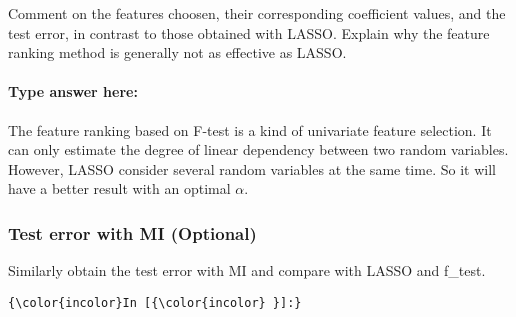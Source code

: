 \documentclass[11pt]{article}
\begin{document}
Comment on the features choosen, their corresponding coefficient values,
and the test error, in contrast to those obtained with LASSO. Explain
why the feature ranking method is generally not as effective as LASSO.

    \hypertarget{type-answer-here}{%
\paragraph{Type answer here:}\label{type-answer-here}}

The feature ranking based on F-test is a kind of univariate feature
selection. It can only estimate the degree of linear dependency between
two random variables. However, LASSO consider several random variables
at the same time. So it will have a better result with an optimal
\(\alpha\).

    \hypertarget{test-error-with-mi-optional}{%
\subsubsection{Test error with MI
(Optional)}\label{test-error-with-mi-optional}}

Similarly obtain the test error with MI and compare with LASSO and
f\_test.

    \begin{Verbatim}[commandchars=\\\{\}]
{\color{incolor}In [{\color{incolor} }]:} 
\end{Verbatim}



    
    
    
    
\end{document}
